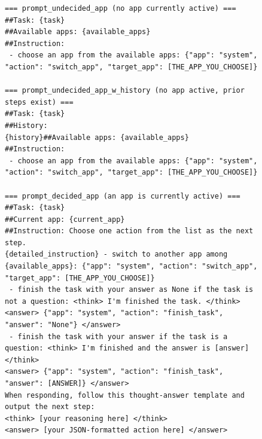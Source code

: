 \begin{figure}[t]
\begin{lstlisting}[style=prettyprompt, captionpos=b, caption={OfficeBench agent prompt (2/2): the three per-step user prompt templates appended at each turn. The template is selected by whether an app is currently active and whether prior steps exist as history.}, label={lst:officebench_prompt_steps}]
=== prompt_undecided_app (no app currently active) ===
##Task: {task}
##Available apps: {available_apps}
##Instruction:
 - choose an app from the available apps: {"app": "system", "action": "switch_app", "target_app": [THE_APP_YOU_CHOOSE]}

=== prompt_undecided_app_w_history (no app active, prior steps exist) ===
##Task: {task}
##History:
{history}##Available apps: {available_apps}
##Instruction:
 - choose an app from the available apps: {"app": "system", "action": "switch_app", "target_app": [THE_APP_YOU_CHOOSE]}

=== prompt_decided_app (an app is currently active) ===
##Task: {task}
##Current app: {current_app}
##Instruction: Choose one action from the list as the next step.
{detailed_instruction} - switch to another app among {available_apps}: {"app": "system", "action": "switch_app", "target_app": [THE_APP_YOU_CHOOSE]}
 - finish the task with your answer as None if the task is not a question: <think> I'm finished the task. </think>
<answer> {"app": "system", "action": "finish_task", "answer": "None"} </answer>
 - finish the task with your answer if the task is a question: <think> I'm finished and the answer is [answer] </think>
<answer> {"app": "system", "action": "finish_task", "answer": [ANSWER]} </answer>
When responding, follow this thought-answer template and output the next step:
<think> [your reasoning here] </think>
<answer> [your JSON-formatted action here] </answer>
\end{lstlisting}
\end{figure}